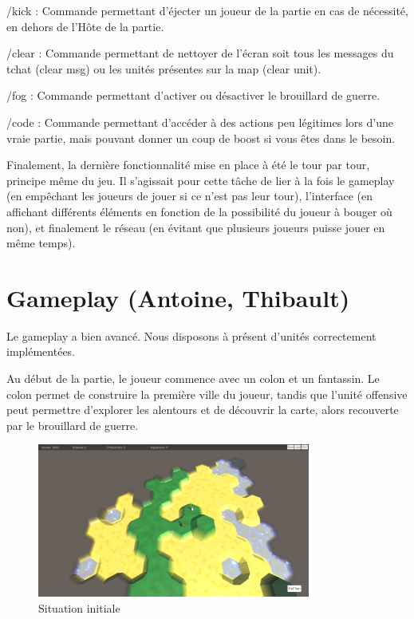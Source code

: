 \documentclass[12pt]{report}
\begin{document}
/kick : Commande permettant d’éjecter un joueur de la partie en cas de
nécessité, en dehors de l'Hôte de la partie.

/clear : Commande permettant de nettoyer de l’écran soit tous les messages du
tchat (clear msg) ou les unités présentes sur la map (clear unit).

/fog : Commande permettant d’activer ou désactiver le brouillard de guerre.

/code :  Commande permettant d'accéder à des actions peu légitimes lors d’une
vraie partie, mais pouvant donner un coup de boost si vous êtes dans le besoin.

Finalement, la dernière fonctionnalité mise en place à été le tour par tour,
principe même du jeu. Il s’agissait pour cette tâche de lier à la fois le
gameplay (en empêchant les joueurs de jouer si ce n’est pas leur tour),
l’interface (en affichant différents éléments en fonction de la possibilité du
joueur à bouger où non), et finalement le réseau (en évitant que plusieurs
joueurs puisse jouer en même temps).

\newpage

\section{Gameplay (Antoine, Thibault)}

Le gameplay a bien avancé. Nous disposons à présent d’unités correctement
implémentées.

Au début de la partie, le joueur commence avec un colon et un fantassin. Le
colon permet de construire la première ville du joueur, tandis que l’unité
offensive peut permettre d’explorer les alentours et de découvrir la carte,
alors recouverte par le brouillard de guerre. 

\begin{figure}[H]
    \centering
    \includegraphics[width=0.8\textwidth]{InitialSituation}
    \caption{Situation initiale}
\end{figure}
\end{document}

